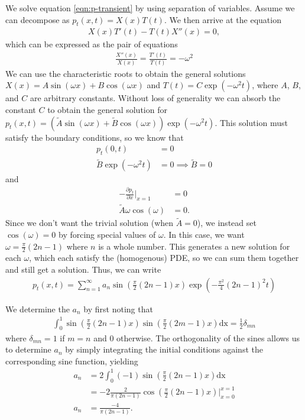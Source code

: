 \documentclass{article}
\begin{document}
We solve equation \eqref{eqn:p-transient} by using separation of variables. Assume we can decompose as $p_t(x,t) = X(x)T(t)$.
We then arrive at the equation
\begin{align}
    X(x)T'(t) - T(t)X''(x) = 0,
\end{align}
which can be expressed as the pair of equations
\begin{align}
    \frac{X''(x)}{X(x)} = \frac{T'(t)}{T(t)} = -\omega^2
\end{align}
We can use the characteristic roots to obtain the general solutions $X(x) = A\sin(\omega x) + B\cos(\omega x)$ and $T(t) = C\exp(-\omega^2 t)$, where $A$, $B$, and $C$ are arbitrary constants.
Without loss of generality we can absorb the constant $C$ to obtain the general solution for $p_t(x,t) = (\tilde{A}\sin(\omega x) + \tilde{B}\cos(\omega x))\exp(-\omega^2 t)$.
This solution must satisfy the boundary conditions, so we know that
\begin{align}
    p_t(0, t) &= 0 \\
    \tilde{B} \exp(-\omega^2 t) &= 0 \implies \tilde{B} = 0
\end{align}
and
\begin{align}
    -\frac{\partial p_t}{\partial x}\bigg\rvert_{x=1} &= 0 \\
    \tilde{A}\omega \cos(\omega) &= 0.
\end{align}
Since we don't want the trivial solution (when $\tilde{A} = 0$), we instead set $\cos(\omega) = 0$ by forcing special values of $\omega$.
In this case, we want $\omega = \frac{\pi}{2} (2n - 1)$ where $n$ is a whole number.
This generates a new solution for each $\omega$, which each satisfy the (homogenous) PDE, so we can sum them together and still get a solution.
Thus, we can write
\begin{align}
    p_t(x,t) = \sum_{n=1}^{\infty} a_n \sin\left(\frac{\pi}{2} (2n - 1) x\right) \exp\left(-\frac{\pi^2}{4} (2n - 1)^2 t \right)
\end{align}

We determine the $a_n$ by first noting that
\begin{align}
    \int_0^1 \sin\left(\frac{\pi}{2} (2n - 1) x\right) \sin\left(\frac{\pi}{2} (2m - 1) x\right) \mathrm{dx} = \frac{1}{2} \delta_{mn}
\end{align}
where $\delta_{mn} = 1$ if $m = n$ and $0$ otherwise.
The orthogonality of the sines allows us to determine $a_n$ by simply integrating the initial conditions against the corresponding sine function, yielding
\begin{align}
a_n &= 2 \int_0^1 (-1) \sin\left(\frac{\pi}{2} (2n - 1) x\right) \mathrm{dx} \\
    &= -2 \frac{2}{\pi (2n - 1)} \cos\left(\frac{\pi}{2} (2n - 1) x\right) \bigg\rvert_{x=0}^{x=1} \\
a_n &= \frac{-4}{\pi (2n - 1)}.
\end{align}
\end{document}
